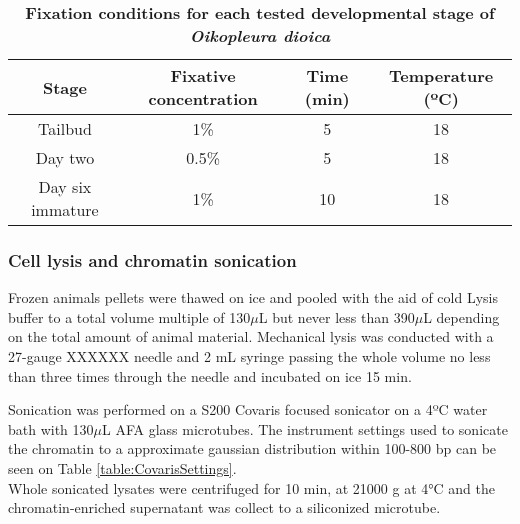 \documentclass[11pt,twoside,a4paper]{report}
\begin{document}
    		 \begin{table}[!ht]
	    	    \caption{\bf{Fixation conditions for each tested developmental stage of \textit{Oikopleura dioica}}}
        		\begin{center}
		            \begin{tabular}{|c|c|c|c|}
        		        \hline
                		\textbf{Stage} & \textbf{Fixative concentration} & \textbf{Time (min)} & \textbf{Temperature (ºC)}\\
		                \hline
		                Tailbud & 1\% & 5 & 18\\
		                Day two & 0.5\% & 5 & 18\\
		                Day six immature & 1\% & 10 & 18\\
		                \hline
        		    \end{tabular}
		        \end{center}
        		\label{table:ODfixation}
		    \end{table}
    
    			\subsubsection{Cell lysis and chromatin sonication}
			Frozen animals pellets were thawed on ice and pooled with the aid of cold Lysis buffer to a total volume multiple of 130$\mu$L but never less than 390$\mu$L depending on the total amount of animal material.		
			Mechanical lysis was conducted with a 27-gauge XXXXXX needle and 2 mL syringe passing the whole volume no less than three times through the needle and incubated on ice 15 min.
			
			Sonication was performed on a S200 Covaris focused sonicator on a 4ºC water bath with 130$\mu$L AFA glass microtubes. The instrument settings used to sonicate the chromatin to a approximate gaussian distribution within 100-800 bp can be seen on Table \ref{table:CovarisSettings}. \\
			Whole sonicated lysates were centrifuged for 10 min, at 21000 g at 4°C and the chromatin-enriched supernatant was collect to a siliconized microtube.
			
\end{document}
